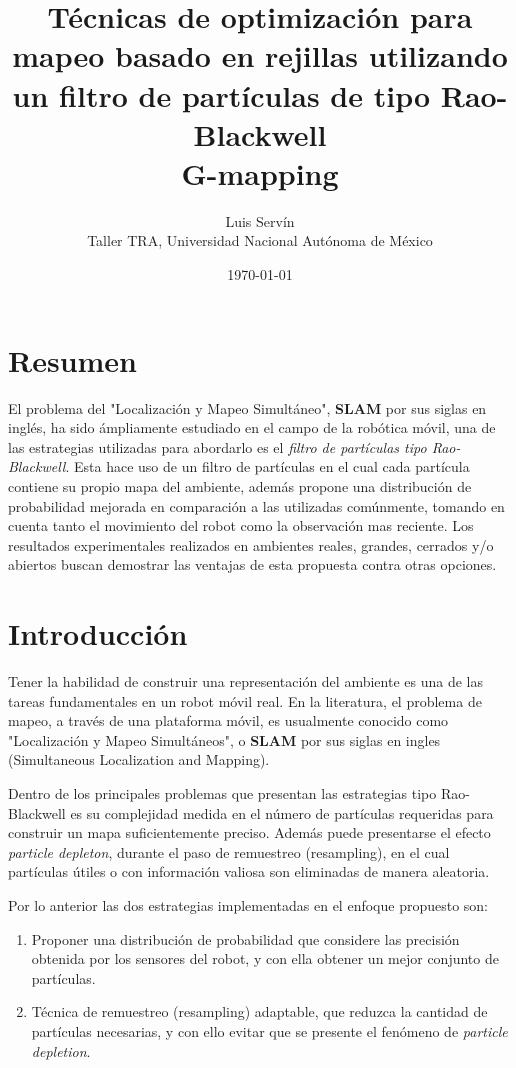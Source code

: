 \documentclass[10pt,a4paper]{article}
\title{Técnicas de optimización para mapeo basado en rejillas utilizando un filtro de partículas de tipo Rao-Blackwell \\ \large{G-mapping}}
\date{\today}
\author{Luis Servín\\ Taller TRA, Universidad Nacional Autónoma de México}
\begin{document}
\maketitle

\section*{Resumen}

El problema del "Localización y Mapeo Simultáneo", \textbf{SLAM} por sus siglas en inglés, ha sido ámpliamente estudiado en el campo de la robótica móvil, una de las estrategias utilizadas para abordarlo es el \emph{filtro de partículas tipo Rao-Blackwell}. Esta hace uso de un filtro de partículas en el cual cada partícula contiene su propio mapa del ambiente, además propone una distribución de probabilidad mejorada en comparación a las utilizadas comúnmente, tomando en cuenta tanto el movimiento del robot como la observación mas reciente. Los resultados experimentales realizados en ambientes reales, grandes, cerrados y/o abiertos buscan demostrar las ventajas de esta propuesta contra otras opciones.






\section{Introducción}

Tener la habilidad de construir una representación del ambiente es una de las tareas fundamentales en un robot móvil real. En la literatura, el problema de mapeo, a través de una plataforma móvil, es usualmente conocido como "Localización y Mapeo Simultáneos", o \textbf{SLAM} por sus siglas en ingles (Simultaneous Localization and Mapping).

Dentro de los principales problemas que presentan las estrategias tipo Rao-Blackwell es su complejidad medida en el número de partículas requeridas para construir un mapa suficientemente preciso. Además puede presentarse el efecto \emph{particle depleton}, durante el paso de remuestreo (resampling), en el cual partículas útiles o con información valiosa son eliminadas de manera aleatoria.

Por lo anterior las dos estrategias implementadas en el enfoque propuesto son:

\begin{enumerate}

	\item Proponer una distribución de probabilidad que considere las precisión obtenida por los sensores del robot, y con ella obtener un mejor conjunto de partículas.

	\item Técnica de remuestreo (resampling) adaptable, que reduzca la cantidad de partículas necesarias, y con ello evitar que se presente el fenómeno de \emph{particle depletion}.

\end{enumerate}
\end{document}
